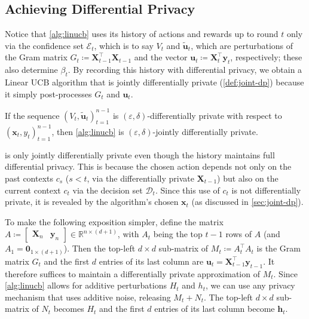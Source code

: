\documentclass{article}
\renewcommand{\vec}[1]{\bm{#1}}
\newcommand{\defeq}{\coloneq}
\newcommand{\Real}{\mathds{R}}
\newcommand{\E}{\mathcal{E}}
\providecommand\transp{\top}
\let\transpsymbol\transp
\renewcommand{\transp}[1]{#1^\transpsymbol}
\newcommand{\Dset}[1]{\mathcal{D}_{#1}}
\newcommand{\XtX}[1]{\transp{#1}{#1}}
\begin{document}
\subsection{Achieving Differential Privacy}
\label{sec:alg-dp}

Notice that \cref{alg:linucb} uses its history of actions and rewards
up to round $t$ only via the confidence set $\E_t$, which is to say
$V_t$ and $\tilde{\vec u}_t$, which are perturbations of the Gram
matrix $G_t\defeq\XtX{\vec X_{t-1}}$ and the vector
$\vec u_t \defeq \transp{\vec X_t} \vec y_t$, respectively; these also
determine $\beta_t$.  By recording this history with differential
privacy, we obtain a Linear UCB algorithm that is jointly
differentially private (\cref{def:joint-dp}) because it simply
post-processes $G_t$ and $\vec u_t$.

\begin{claim}
  If the sequence $(V_t,\tilde{\vec u}_t)_{t=1}^{n-1}$ is
  $(\varepsilon,\delta)$-differentially private with respect to
  $(\vec x_t, y_t)_{t=1}^{n-1}$, then \cref{alg:linucb} is
  $(\varepsilon,\delta)$-jointly differentially private.
\end{claim}

\begin{remark}
   is only jointly differentially private even though
  the history maintains full differential privacy.  This is because
  the chosen action depends not only on the past contexts $c_s$
  ($s < t$, via the differentially private $\vec X_{t-1}$) but also on
  the current context $c_t$ via the decision set $\Dset{t}$.  Since
  this use of $c_t$ is not differentially private, it is revealed by
  the algorithm's chosen $\vec x_t$ (as discussed in
  \cref{sec:joint-dp}).
\end{remark}

To make the following exposition simpler, define the matrix
$A \defeq \begin{bmatrix} \vec X_n & \vec y_n \end{bmatrix} \in
\Real^{n\times(d+1)}$, with $A_t$ being the top $t-1$ rows of $A$ (and
$A_1 = \vec 0_{1\times(d+1)}$).  Then the top-left $d\times d$
sub-matrix of $M_t \defeq \XtX{A_t}$ is the Gram matrix $G_t$ and the
first $d$ entries of its last column are
$\vec u_t = \transp{\vec X_{t-1}}\vec y_{t-1}$.  It therefore suffices
to maintain a differentially private approximation of $M_t$. Since
\cref{alg:linucb} allows for additive perturbations $H_t$ and $h_t$,
we can use any privacy mechanism that uses additive noise, releasing
$M_t + N_t$.  The top-left $d\times d$ sub-matrix of $N_t$ becomes
$H_t$ and the first $d$ entries of its last column become $\vec h_t$.
\end{document}
